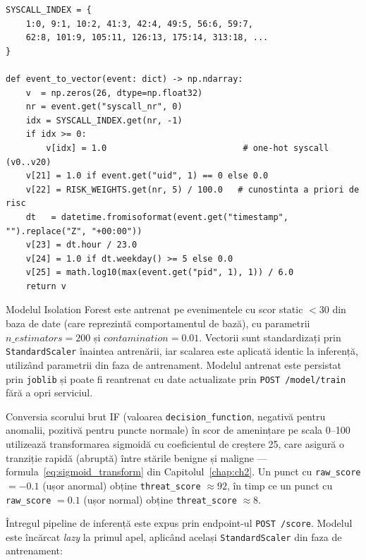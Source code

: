 \begin{lstlisting}[style=pythonstyle,caption={Funcția \texttt{event\_to\_vector}: construirea vectorului de 26 de trăsături}]
SYSCALL_INDEX = {
    1:0, 9:1, 10:2, 41:3, 42:4, 49:5, 56:6, 59:7,
    62:8, 101:9, 105:11, 126:13, 175:14, 313:18, ...
}

def event_to_vector(event: dict) -> np.ndarray:
    v  = np.zeros(26, dtype=np.float32)
    nr = event.get("syscall_nr", 0)
    idx = SYSCALL_INDEX.get(nr, -1)
    if idx >= 0:
        v[idx] = 1.0                           # one-hot syscall (v0..v20)
    v[21] = 1.0 if event.get("uid", 1) == 0 else 0.0
    v[22] = RISK_WEIGHTS.get(nr, 5) / 100.0   # cunostinta a priori de risc
    dt   = datetime.fromisoformat(event.get("timestamp", "").replace("Z", "+00:00"))
    v[23] = dt.hour / 23.0
    v[24] = 1.0 if dt.weekday() >= 5 else 0.0
    v[25] = math.log10(max(event.get("pid", 1), 1)) / 6.0
    return v
\end{lstlisting}

\par Modelul Isolation Forest este antrenat pe evenimentele cu scor static $< 30$ din baza de date (care reprezintă comportamentul de bază), cu parametrii $n\_estimators=200$ și $contamination=0.01$. Vectorii sunt standardizați prin \texttt{StandardScaler} \cite{Pedregosa2011} înaintea antrenării, iar scalarea este aplicată identic la inferență, utilizând parametrii din faza de antrenament. Modelul antrenat este persistat prin \texttt{joblib} și poate fi reantrenat cu date actualizate prin \texttt{POST /model/train} fără a opri serviciul.

\par Conversia scorului brut IF (valoarea \texttt{decision\_function}, negativă pentru anomalii, pozitivă pentru puncte normale) în scor de amenințare pe scala 0--100 utilizează transformarea sigmoidă cu coeficientul de creștere 25, care asigură o tranziție rapidă (abruptă) între stările benigne și maligne --- formula~\ref{eq:sigmoid_transform} din Capitolul~\ref{chap:ch2}. Un punct cu \texttt{raw\_score} $= -0.1$ (ușor anormal) obține \texttt{threat\_score} $\approx 92$, în timp ce un punct cu \texttt{raw\_score} $= 0.1$ (ușor normal) obține \texttt{threat\_score} $\approx 8$.

\par Întregul pipeline de inferență este expus prin endpoint-ul \texttt{POST /score}. Modelul este încărcat \textit{lazy} la primul apel, aplicând același \texttt{StandardScaler} din faza de antrenament:

